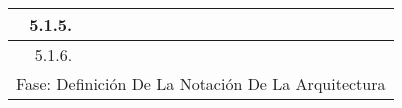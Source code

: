 \documentclass[12pt]{article}
\begin{document}
\begin{table}[H]
{\begin{tabular}{|rllllllllllllllll|}
			\multicolumn{1}{|r|}{5.1.5.}                                       & \multicolumn{1}{l|}{}                          & \multicolumn{1}{l|}{}                          & \multicolumn{1}{c|}{\cellcolor[HTML]{B6D7A8}}  & \multicolumn{1}{c|}{\cellcolor[HTML]{B6D7A8}}  & \multicolumn{1}{l|}{}                          & \multicolumn{1}{l|}{}                          & \multicolumn{1}{l|}{}                          & \multicolumn{1}{l|}{}                          & \multicolumn{1}{l|}{}                          & \multicolumn{1}{l|}{}                           & \multicolumn{1}{l|}{}                           & \multicolumn{1}{l|}{}                           & \multicolumn{1}{l|}{}                           & \multicolumn{1}{l|}{}                           & \multicolumn{1}{l|}{}                           &                                                 \\ \hline
			\multicolumn{1}{|r|}{5.1.6.}                                       & \multicolumn{1}{l|}{}                          & \multicolumn{1}{l|}{}                          & \multicolumn{1}{l|}{}                          & \multicolumn{1}{c|}{\cellcolor[HTML]{B6D7A8}}  & \multicolumn{1}{l|}{}                          & \multicolumn{1}{l|}{}                          & \multicolumn{1}{l|}{}                          & \multicolumn{1}{l|}{}                          & \multicolumn{1}{l|}{}                          & \multicolumn{1}{l|}{}                           & \multicolumn{1}{l|}{}                           & \multicolumn{1}{l|}{}                           & \multicolumn{1}{l|}{}                           & \multicolumn{1}{l|}{}                           & \multicolumn{1}{l|}{}                           &                                                 \\ \hline
			\multicolumn{17}{|c|}{\cellcolor[HTML]{D9D9D9}Fase: Definición De La Notación De La Arquitectura}                                                                                                                                                                                                                                                                                                                                                                                                                                                                                                                                                                                                                                                                                                                                                                                         \\ \hline

\end{tabular}}
\end{table}
\end{document}
